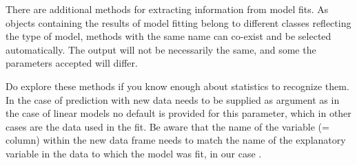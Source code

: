 \documentclass[krantz2]{krantz}\usepackage{knitr}%
\begin{document}
\begin{playground}
There are additional methods for extracting information from model fits. As objects containing the results of model fitting belong to different classes reflecting the type of model, methods with the same name can co-exist and be selected automatically. The output will not be necessarily the same, and some the parameters accepted will differ.

\begin{knitrout}\footnotesize
{}\color{fgcolor}\begin{kframe}
\begin{alltt}
\end{alltt}
\end{kframe}
\end{knitrout}

Do explore these methods if you know enough about statistics to recognize them. In the case of prediction with  new data needs to be supplied as argument as in the case of linear models no default is provided for this parameter, which in other cases are the data used in the fit. Be aware that the name of the variable (= column) within the new data frame needs to match the name of the explanatory variable in the data to which the model was fit, in our case .

\begin{knitrout}\footnotesize
{}\color{fgcolor}\begin{kframe}
\begin{alltt}
 \hlkwb{<-} \hlstd{(} \hlstd{=} \hlopt{:}\hlstd{)}
\end{alltt}
\end{kframe}
\end{knitrout}

\begin{knitrout}\footnotesize
{}\color{fgcolor}\begin{kframe}
\begin{alltt}
  
\end{alltt}
\end{kframe}
\end{knitrout}

\begin{knitrout}\footnotesize
{}\color{fgcolor}\begin{kframe}
\begin{alltt}
    \hlstd{=} \hlstd{,}  \hlstd{=} \hlstd{)}
\end{alltt}
\end{kframe}
\end{knitrout}
\end{playground}
\end{document}
